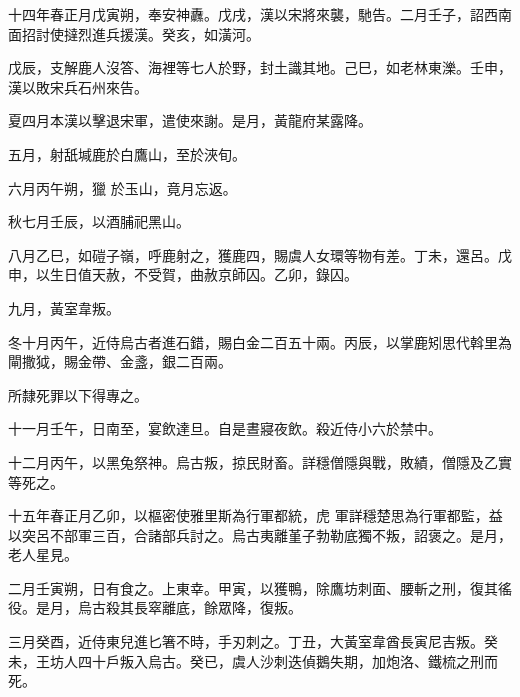 
\begin{pinyinscope}

 十四年春正月戊寅朔，奉安神纛。戊戌，漢以宋將來襲，馳告。二月壬子，詔西南面招討使撻烈進兵援漢。癸亥，如潢河。



 戊辰，支解鹿人沒答、海裡等七人於野，封土識其地。己巳，如老林東濼。壬申，漢以敗宋兵石州來告。



 夏四月本漢以擊退宋軍，遣使來謝。是月，黃龍府某露降。



 五月，射舐堿鹿於白鷹山，至於浹旬。



 六月丙午朔，獵
 於玉山，竟月忘返。



 秋七月壬辰，以酒脯祀黑山。



 八月乙巳，如磑子嶺，呼鹿射之，獲鹿四，賜虞人女環等物有差。丁未，還呂。戊申，以生日值天赦，不受賀，曲赦京師囚。乙卯，錄囚。



 九月，黃室韋叛。



 冬十月丙午，近侍烏古者進石錯，賜白金二百五十兩。丙辰，以掌鹿矧思代斡里為閘撒狘，賜金帶、金盞，銀二百兩。



 所隸死罪以下得專之。



 十一月壬午，日南至，宴飲達旦。自是晝寢夜飲。殺近侍小六於禁中。



 十二月丙午，以黑兔祭神。烏古叛，掠民財畜。詳穩僧隱與戰，敗績，僧隱及乙實等死之。



 十五年春正月乙卯，以樞密使雅里斯為行軍都統，虎
 軍詳穩楚思為行軍都監，益以突呂不部軍三百，合諸部兵討之。烏古夷離堇子勃勒底獨不叛，詔褒之。是月，老人星見。



 二月壬寅朔，日有食之。上東幸。甲寅，以獲鴨，除鷹坊刺面、腰斬之刑，復其徭役。是月，烏古殺其長窣離底，餘眾降，復叛。



 三月癸酉，近侍東兒進匕箸不時，手刃刺之。丁丑，大黃室韋酋長寅尼吉叛。癸未，王坊人四十戶叛入烏古。癸已，虞人沙刺迭偵鵝失期，加炮洛、鐵梳之刑而死。




\end{pinyinscope}
